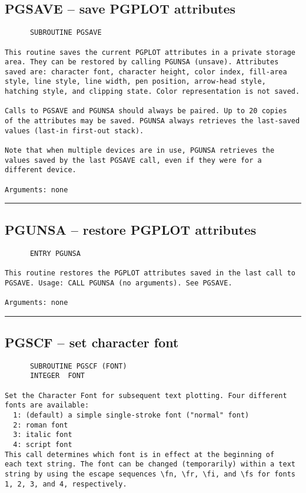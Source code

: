 {\subsection*{PGSAVE -- save PGPLOT attributes }
\begin{verbatim}
      SUBROUTINE PGSAVE

This routine saves the current PGPLOT attributes in a private storage
area. They can be restored by calling PGUNSA (unsave). Attributes
saved are: character font, character height, color index, fill-area
style, line style, line width, pen position, arrow-head style, 
hatching style, and clipping state. Color representation is not saved.

Calls to PGSAVE and PGUNSA should always be paired. Up to 20 copies
of the attributes may be saved. PGUNSA always retrieves the last-saved
values (last-in first-out stack).

Note that when multiple devices are in use, PGUNSA retrieves the
values saved by the last PGSAVE call, even if they were for a
different device.

Arguments: none
\end{verbatim}
\hrule


\subsection*{PGUNSA -- restore PGPLOT attributes }
\begin{verbatim}
      ENTRY PGUNSA

This routine restores the PGPLOT attributes saved in the last call to
PGSAVE. Usage: CALL PGUNSA (no arguments). See PGSAVE.

Arguments: none
\end{verbatim}
\hrule


\subsection*{PGSCF -- set character font }
\begin{verbatim}
      SUBROUTINE PGSCF (FONT)
      INTEGER  FONT

Set the Character Font for subsequent text plotting. Four different
fonts are available:
  1: (default) a simple single-stroke font ("normal" font)
  2: roman font
  3: italic font
  4: script font
This call determines which font is in effect at the beginning of
each text string. The font can be changed (temporarily) within a text
string by using the escape sequences \fn, \fr, \fi, and \fs for fonts
1, 2, 3, and 4, respectively.


\end{verbatim}}
